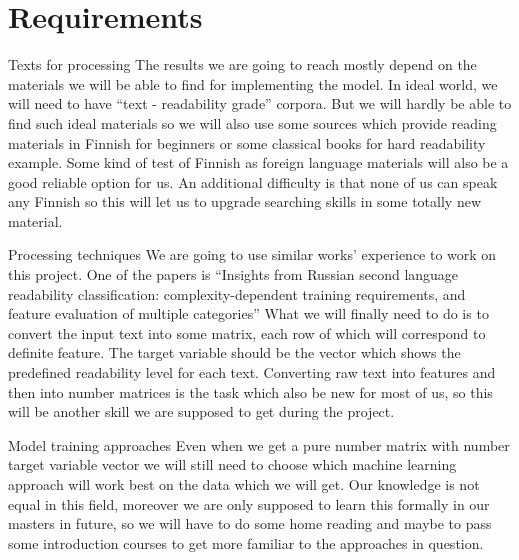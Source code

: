 \documentclass{article}
\begin{document}
\section{Requirements}
Texts for processing\newline
The results we are going to reach mostly depend on the materials we will be able to find for implementing the model. In ideal world, we will need to have “text - readability grade” corpora. But we will hardly be able to find such ideal materials so we will also use some sources which provide reading materials in Finnish for beginners or some classical books for hard readability example. Some kind of test of Finnish as foreign language materials will also be a good reliable option for us. 
An additional difficulty is that none of us can speak any Finnish so this will let us to upgrade searching skills in some totally new material.

Processing techniques\newline
We are going to use similar works’ experience to work on this project. One of the papers is “Insights from Russian second language readability classification: complexity-dependent training requirements, and feature evaluation of multiple categories” 
What we will finally need to do is to convert the input text into some matrix, each row of which will correspond to definite feature. The target variable should be the vector which shows the predefined readability level for each text.
Converting raw text into features and then into number matrices is the task which also be new for most of us, so this will be another skill we are supposed to get during the project.

Model training approaches\newline
Even when we get a pure number matrix with number target variable vector we will still need to choose which machine learning approach will work best on the data which we will get. Our knowledge is not equal in this field, moreover we are only supposed to learn this formally in our masters in future, so we will have to do some home reading and maybe to pass some introduction courses to get more familiar to the approaches in question.
\end{document}
